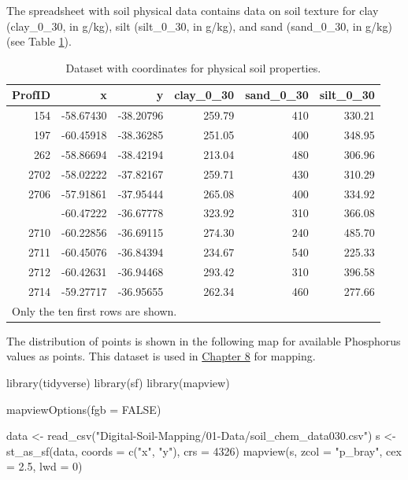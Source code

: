 \documentclass[
  10pt,
  b5paper,
  oneside]{book}
\newenvironment{Shaded}{\begin{snugshade}}{\end{snugshade}}
\newcommand{\AttributeTok}[1]{\textcolor[rgb]{0.77,0.63,0.00}{#1}}
\newcommand{\ConstantTok}[1]{\textcolor[rgb]{0.00,0.00,0.00}{#1}}
\newcommand{\DecValTok}[1]{\textcolor[rgb]{0.00,0.00,0.81}{#1}}
\newcommand{\FloatTok}[1]{\textcolor[rgb]{0.00,0.00,0.81}{#1}}
\newcommand{\FunctionTok}[1]{\textcolor[rgb]{0.00,0.00,0.00}{#1}}
\newcommand{\NormalTok}[1]{#1}
\newcommand{\OtherTok}[1]{\textcolor[rgb]{0.56,0.35,0.01}{#1}}
\newcommand{\StringTok}[1]{\textcolor[rgb]{0.31,0.60,0.02}{#1}}
\begin{document}
The spreadsheet with soil physical data contains data on soil texture for clay (clay\_0\_30, in g/kg), silt (silt\_0\_30, in g/kg), and sand (sand\_0\_30, in g/kg) (see Table \ref{tab:table22}).

\begin{table}

\caption{\label{tab:table22}Dataset with coordinates for physical soil properties.}
\centering
\begin{tabular}[t]{rrrrrr}
\toprule
ProfID & x & y & clay\_0\_30 & sand\_0\_30 & silt\_0\_30\\
\midrule
154 & -58.67430 & -38.20796 & 259.79 & 410 & 330.21\\
197 & -60.45918 & -38.36285 & 251.05 & 400 & 348.95\\
262 & -58.86694 & -38.42194 & 213.04 & 480 & 306.96\\
2702 & -58.02222 & -37.82167 & 259.71 & 430 & 310.29\\
2706 & -57.91861 & -37.95444 & 265.08 & 400 & 334.92\\
\addlinespace
2709 & -60.47222 & -36.67778 & 323.92 & 310 & 366.08\\
2710 & -60.22856 & -36.69115 & 274.30 & 240 & 485.70\\
2711 & -60.45076 & -36.84394 & 234.67 & 540 & 225.33\\
2712 & -60.42631 & -36.94468 & 293.42 & 310 & 396.58\\
2714 & -59.27717 & -36.95655 & 262.34 & 460 & 277.66\\
\bottomrule
\multicolumn{6}{l}{\rule{0pt}{1em}Only the ten first rows are shown.}\\
\end{tabular}
\end{table}

The distribution of points is shown in the following map for available Phosphorus values as points. This dataset is used in \href{https://fao-gsp.github.io/GSNmap-TM/step-3-mapping-continuous-soil-properties.html}{Chapter 8} for mapping.

\begin{Shaded}
\begin{Highlighting}[]
\FunctionTok{library}\NormalTok{(tidyverse)}
\FunctionTok{library}\NormalTok{(sf)}
\FunctionTok{library}\NormalTok{(mapview)}

\FunctionTok{mapviewOptions}\NormalTok{(}\AttributeTok{fgb =} \ConstantTok{FALSE}\NormalTok{)}

\NormalTok{data }\OtherTok{\textless{}{-}} 
  \FunctionTok{read\_csv}\NormalTok{(}\StringTok{"Digital{-}Soil{-}Mapping/01{-}Data/soil\_chem\_data030.csv"}\NormalTok{)}
\NormalTok{s }\OtherTok{\textless{}{-}} \FunctionTok{st\_as\_sf}\NormalTok{(data, }\AttributeTok{coords =} \FunctionTok{c}\NormalTok{(}\StringTok{"x"}\NormalTok{, }\StringTok{"y"}\NormalTok{), }\AttributeTok{crs =} \DecValTok{4326}\NormalTok{)}
\FunctionTok{mapview}\NormalTok{(s, }\AttributeTok{zcol =} \StringTok{"p\_bray"}\NormalTok{, }\AttributeTok{cex =} \FloatTok{2.5}\NormalTok{, }\AttributeTok{lwd =} \DecValTok{0}\NormalTok{)}
\end{Highlighting}
\end{Shaded}
\end{document}
